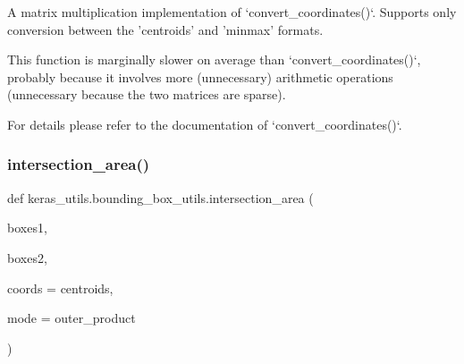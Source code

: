 \begin{DoxyVerb}A matrix multiplication implementation of `convert_coordinates()`.
Supports only conversion between the 'centroids' and 'minmax' formats.

This function is marginally slower on average than `convert_coordinates()`,
probably because it involves more (unnecessary) arithmetic operations (unnecessary
because the two matrices are sparse).

For details please refer to the documentation of `convert_coordinates()`.
\end{DoxyVerb}
 \mbox{\label{namespacekeras__utils_1_1bounding__box__utils_a91ddfb47dfc8b356861c2a04950b7913}} 
\subsubsection{\texorpdfstring{intersection\+\_\+area()}{intersection\_area()}}
{\footnotesize\ttfamily def keras\+\_\+utils.\+bounding\+\_\+box\+\_\+utils.\+intersection\+\_\+area (\begin{DoxyParamCaption}\item[{}]{boxes1,  }\item[{}]{boxes2,  }\item[{}]{coords = {\ttfamily \textquotesingle{}centroids\textquotesingle{}},  }\item[{}]{mode = {\ttfamily \textquotesingle{}outer\+\_\+product\textquotesingle{}} }\end{DoxyParamCaption})}

